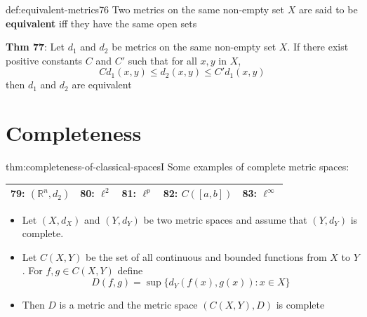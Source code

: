 \documentclass[landscape, 8pt]{extarticle}
\begin{document}
\begin{multicols}{3}
\begin{dfn}{def:equivalent-metrics}{76}
    Two metrics on the same non-empty set $X$ are said to be \textbf{equivalent} iff they have the same open sets

    \longrule{0.08ex}
    \textbf{Thm 77}: Let $d_{1}$ and $d_{2}$ be metrics on the same non-empty set $X$. If there exist positive constants $C$ and $C'$ such that for all $x, y$ in $X$,
    \[Cd_{1}(x, y) \le d_{2}(x, y) \le C'd_{1}(x, y)\]
    then $d_{1}$ and $d_{2}$ are equivalent
\end{dfn}



\newpage

\section{Completeness}
\begin{thm}{thm:completeness-of-classical-spaces}{I}
    \vspace{-5pt}
    Some examples of complete metric spaces:

    \vspace{-6pt}
    \begin{center}
    \def\arraystretch{1.7}
    \begin{tabular}{ |c|c|c|c|c| }
        \hline
        \textbf{79}: $(\mathbb{R}^{n}, d_{2})$ & \textbf{80}: $\ell^{2}$ & \textbf{81}: $\ell^{p}$ & \textbf{82}: $C([a, b])$ & \textbf{83}: $\ell^{\infty}$ \\
        \hline
    \end{tabular}
    \end{center}

    \vspace{-3pt}
    \vspace{-8pt}

    \begin{itemize}[leftmargin=*]
        \item Let $(X, d_{X})$ and $(Y, d_{Y})$ be two metric spaces and assume that $(Y, d_{Y})$ is complete.
        \item Let $C(X, Y)$ be the set of all continuous and bounded functions from $X$ to $Y$. For $f, g\in C(X, Y)$ define
            \[D(f, g) = \sup \{d_{Y}(f(x), g(x)) : x\in X\}\]
        \item Then $D$ is a metric and the metric space $(C(X, Y), D)$ is complete
    \end{itemize}
\end{thm}


\end{multicols}
\end{document}
